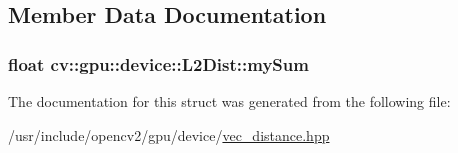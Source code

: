 \subsection{Member Data Documentation}
\hypertarget{structcv_1_1gpu_1_1device_1_1L2Dist_ac6728e638a010ee25a36eceb55b51743}{
\subsubsection[{my\-Sum}]{\setlength{\rightskip}{0pt plus 5cm}float cv\-::gpu\-::device\-::\-L2\-Dist\-::my\-Sum}}\label{structcv_1_1gpu_1_1device_1_1L2Dist_ac6728e638a010ee25a36eceb55b51743}


The documentation for this struct was generated from the following file\-:\begin{DoxyCompactItemize}
\item 
/usr/include/opencv2/gpu/device/\hyperlink{vec__distance_8hpp}{vec\-\_\-distance.\-hpp}\end{DoxyCompactItemize}
